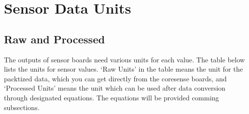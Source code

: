 \section{Sensor Data Units}\label{section:parameterUnits}
\subsection { Raw and Processed} 


The outputs of sensor boards need various units for each value.
The table below lists the units for sensor values.
`Raw Units' in the table means the unit for the packtized data, which you can get directly from the coresense boards, and `Processed Units' means the unit which can be used after data conversion through designated equations.
The equations will be provided comming subsections.


